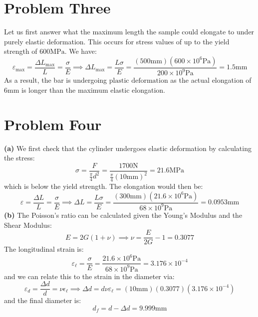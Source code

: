 \documentclass{article}
\begin{document}
    \section*{Problem Three}
    Let us first answer what the maximum length the sample could elongate to under purely elastic deformation. This occurs for stress values of up to the yield strength of $600\si{\mega\pascal}$. We have:
    \begin{equation}
        \varepsilon_\text{max} = \frac{\Delta L_\text{max}}{L} = \frac{\sigma}{E} \implies \Delta L_\text{max} = \frac{L\sigma}{E} = \frac{(500\si{\milli\meter})(600\times 10^6 \si{\pascal})}{200 \times 10^9 \si{\pascal}} = \boxed{1.5\si{\milli\meter}}
    \end{equation}
    As a result, the bar is undergoing $\boxed{\text{plastic deformation}}$ as the actual elongation of $6\si{\milli\meter}$ is longer than the maximum elastic elongation.
    \section*{Problem Four}
    \textbf{(a)}
    We first check that the cylinder undergoes elastic deformation by calculating the stress:
    \begin{equation}
        \sigma = \frac{F}{\frac{\pi}{4} d^2} = \frac{1700\si{\newton}}{\frac{\pi}{4}(10\si{\milli\meter})^2} = 21.6\si{\mega\pascal}
    \end{equation}
    which is below the yield strength. The elongation would then be:
    \begin{equation}
        \varepsilon = \frac{\Delta L}{L} = \frac{\sigma}{E} \implies \Delta L = \frac{L \sigma}{E} = \frac{(300\si{\milli\meter})(21.6\times 10^6 \si{\pascal})}{68\times 10^9 \si{\pascal}} = \boxed{0.0953 \si{\milli\meter}}
    \end{equation}
    \textbf{(b)} The Poisson's ratio can be calculated given the Young's Modulus and the Shear Modulus:
    \begin{equation}
        E = 2G(1+\nu) \implies \nu = \frac{E}{2G}-1 = 0.3077
    \end{equation}
    The longitudinal strain is:
    \begin{equation}
        \varepsilon_\ell = \frac{\sigma}{E} = \frac{21.6\times 10^6 \si{\pascal}}{68\times 10^9 \si{\pascal}} = 3.176 \times 10^{-4}
    \end{equation}
    and we can relate this to the strain in the diameter via:
    \begin{equation}
        \varepsilon_d = \frac{\Delta d}{d} = \nu \epsilon_\ell \implies \Delta d = d\nu\varepsilon_\ell = (10\si{\milli\meter})(0.3077)(3.176\times 10^{-4})
    \end{equation}
    and the final diameter is:
    \begin{equation}
        d_f = d - \Delta d = 9.999 \si{\milli\meter}
    \end{equation}
\end{document}

